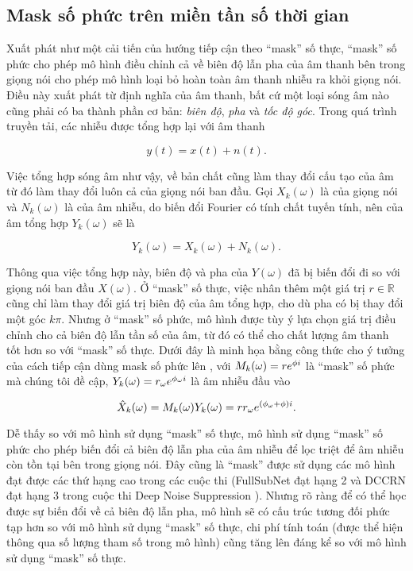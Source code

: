 	\subsection{Mask số phức trên miền tần số thời gian}
	
		Xuất phát như một cải tiến của hướng tiếp cận theo ``mask'' số thực, ``mask'' số phức cho phép mô hình điều chỉnh cả về biên độ lẫn pha của âm thanh bên trong giọng nói cho phép mô hình loại bỏ hoàn toàn âm thanh nhiễu ra khỏi giọng nói. Điều này xuất phát từ định nghĩa của âm thanh, bất cứ một loại sóng âm nào cũng phải có ba thành phần cơ bản: \textit{biên độ}, \textit{pha} và \textit{tốc độ góc}. Trong quá trình truyền tải, các nhiễu được tổng hợp lại với âm thanh
		
			\begin{equation*}
				y(t) = x(t) + n(t).
			\end{equation*}
			
		Việc tổng hợp sóng âm như vậy, về bản chất cũng làm thay đổi cấu tạo của âm từ đó làm thay đổi luôn cả \spectrogram{} của giọng nói ban đầu. Gọi $X_k(\omega)$ là \spectrogram{} của giọng nói và $N_k(\omega)$ là \spectrogram{} của âm nhiễu, do biến đổi Fourier có tính chất tuyến tính, nên \spectrogram{} của âm tổng hợp $Y_k(\omega)$ sẽ là
		
			\begin{equation*}
				Y_k(\omega) = X_k(\omega) + N_k(\omega).
			\end{equation*}
			
		Thông qua việc tổng hợp này, biên độ và pha của $Y(\omega)$ đã bị biến đổi đi so với giọng nói ban đầu $X(\omega)$. Ở ``mask'' số thực, việc nhân thêm một giá trị $r \in \mathbb{R}$ cũng chỉ làm thay đổi giá trị biên độ của âm tổng hợp, cho dù pha có bị thay đổi một góc $k\pi$. Nhưng ở ``mask'' số phức, mô hình được tùy ý lựa chọn giá trị điều chỉnh cho cả biên độ lẫn tần số của âm, từ đó có thể cho chất lượng âm thanh tốt hơn so với ``mask'' số thực. Dưới đây là minh họa bằng công thức cho ý tưởng của cách tiếp cận dùng mask số phức lên \spectrogram{}, với $M_k(\omega) = re^{\phi i}$ là ``mask'' số phức mà chúng tôi đề cập, $Y_k(\omega) = r_\omega e^{\phi_\omega i}$ là âm nhiễu đầu vào
		
			\begin{equation*}
				\hat{X}_k(\omega) = M_k(\omega) Y_k(\omega) = r r_\omega e^{(\phi_\omega + \phi)i}.
			\end{equation*}
		
		Dễ thấy so với mô hình sử dụng ``mask'' số thực, mô hình sử dụng ``mask'' số phức cho phép biến đổi cả biên độ lẫn pha của âm nhiễu để lọc triệt để âm nhiễu còn tồn tại bên trong giọng nói. Đây cũng là ``mask'' được sử dụng các mô hình đạt được các thứ hạng cao trong các cuộc thi (FullSubNet đạt hạng 2 và DCCRN đạt hạng 3 trong cuộc thi Deep Noise Suppression \cite{dns}). Nhưng rõ ràng để có thể học được sự biến đổi về cả biên độ lẫn pha, mô hình sẽ có cấu trúc tương đối phức tạp hơn so với mô hình sử dụng ``mask'' số thực, chi phí tính toán (được thể hiện thông qua số lượng tham số trong mô hình) cũng tăng lên đáng kể so với mô hình sử dụng ``mask'' số thực.
		
